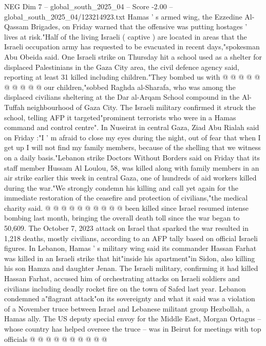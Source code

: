 \begin{textsample}{NEG Dim 7 – global\_south\_2025\_04 – Score -2.00 – global\_south\_2025\_04/123214923.txt}
Hamas ' s armed wing, the Ezzedine Al-Qassam Brigades, on Friday warned that the offensive was putting hostages ' lives at risk."Half of the living Israeli ( captive ) are located in areas that the Israeli occupation army has requested to be evacuated in recent days,"spokesman Abu Obeida said.
One Israeli strike on Thursday hit a school used as a shelter for displaced Palestinians in the Gaza City area, the civil defence agency said, reporting at least 31 killed including children."They bombed us with @ @ @ @ @ @ @ @ @ @ our children,"sobbed Raghda al-Sharafa, who was among the displaced civilians sheltering at the Dar al-Arqam School compound in the Al-Tuffah neighbourhood of Gaza City.
The Israeli military confirmed it struck the school, telling AFP it targeted"prominent terrorists who were in a Hamas command and control centre".
In Nuseirat in central Gaza, Ziad Abu Rialah said on Friday :"I ' m afraid to close my eyes during the night, out of fear that when I get up I will not find my family members, because of the shelling that we witness on a daily basis."Lebanon strike Doctors Without Borders said on Friday that its staff member Hussam Al Loulou, 58, was killed along with family members in an air strike earlier this week in central Gaza, one of hundreds of aid workers killed during the war."We strongly condemn his killing and call yet again for the immediate restoration of the ceasefire and protection of civilians,"the medical charity said. @ @ @ @ @ @ @ @ @ @ been killed since Israel resumed intense bombing last month, bringing the overall death toll since the war began to 50,609.
The October 7, 2023 attack on Israel that sparked the war resulted in 1,218 deaths, mostly civilians, according to an AFP tally based on official Israeli figures.
In Lebanon, Hamas ' s military wing said its commander Hassan Farhat was killed in an Israeli strike that hit"inside his apartment"in Sidon, also killing his son Hamza and daughter Jenan.
The Israeli military, confirming it had killed Hassan Farhat, accused him of orchestrating attacks on Israeli soldiers and civilians including deadly rocket fire on the town of Safed last year.
Lebanon condemned a"flagrant attack"on its sovereignty and what it said was a violation of a November truce between Israel and Lebanese militant group Hezbollah, a Hamas ally.
The US deputy special envoy for the Middle East, Morgan Ortagus -- whose country has helped oversee the truce -- was in Beirut for meetings with top officials @ @ @ @ @ @ @ @ @ @

\end{textsample}
